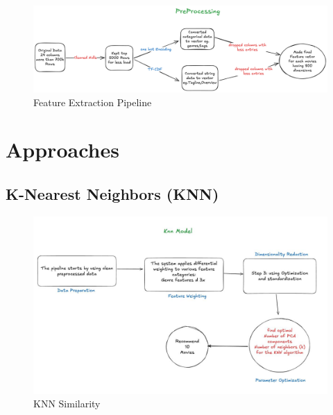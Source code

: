 \documentclass[a4paper]{article}
\theoremstyle{plain}
\begin{document}
\begin{figure}[H]
    \centering
    \includegraphics[width=\linewidth]{pre-processing.png}
    \caption{Feature Extraction Pipeline}
    \label{fig:pipeline}
\end{figure}

\newpage
\section{Approaches}

\subsection{K-Nearest Neighbors (KNN)}
\begin{figure}[H]
    \centering
    \includegraphics[width=\linewidth]{knn.jpg}
    \caption{KNN Similarity}
    \label{fig:knn}
\end{figure}
\end{document}
